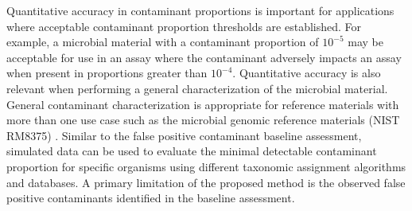 \documentclass[fleqn,10pt,lineno]{wlpeerj}\usepackage[]{graphicx}\usepackage[]{color}
\begin{document}
Quantitative accuracy in contaminant proportions is important for applications where acceptable contaminant proportion thresholds are established.
For example, a microbial material with a contaminant proportion of $10^{-5}$ may be acceptable for use in an assay where the contaminant adversely impacts an assay when present in proportions greater than $10^{-4}$.
Quantitative accuracy is also relevant when performing a general characterization of the microbial material.
General contaminant characterization is appropriate for reference materials with more than one use case such as the microbial genomic reference materials (NIST RM8375) \citep{olson2016pepr}.
Similar to the false positive contaminant baseline assessment,
simulated data can be used to evaluate the minimal detectable contaminant proportion for specific organisms using different taxonomic assignment algorithms and databases.
A primary limitation of the proposed method is the observed false positive contaminants identified in the baseline assessment.  
\end{document}
